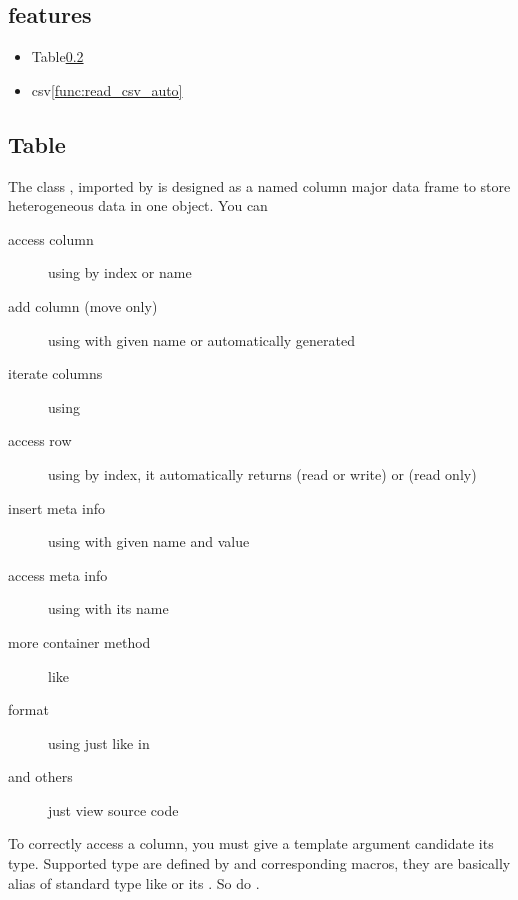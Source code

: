 \documentclass[9pt,a4paper,onecolumn,oneside]{rho-class/rho}
\newcommand{\classref}[1]{\ref{class:#1}}
\newcommand{\funcref}[1]{\ref{func:#1}}
\begin{document}
\subsection{features}
\begin{itemize}
    \item Table\classref{Table}
    \item csv\funcref{read_csv_auto}
\end{itemize}

\subsection{Table}\label{class:Table}

The class , imported by  is designed as a named column major data frame to store heterogeneous data in one object. You can
\begin{description}
    \item[access column] using  by index or name
    \item[add column (move only)] using  with given name or automatically generated
    \item[iterate columns] using 
    \item[access row] using  by index, it automatically returns  (read or write) or  (read only)
    \item[insert meta info] using  with given name and value
    \item[access meta info] using  with its name
    \item[more container method] like 
    \item[format] using  just like  in 
    \item[and others] just view source code
\end{description}
To correctly access a column, you must give  a template argument candidate its type. Supported type are defined by  and corresponding macros, they are basically alias of standard type like  or its . So do .
\end{document}
